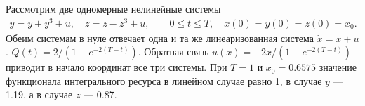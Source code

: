 \documentclass[../main.tex]{subfiles}
\begin{document}
	\begin{pr}
	 Рассмотрим две одномерные нелинейные системы
	 \begin{gather*}
		\dot{y} = y + y^3 + u, \quad 
		\dot{z} = z - z^3 + u, \qquad
		0 \leqslant t \leqslant T, \quad
		x(0) = y(0) = z(0) = x_0. 
	\end{gather*}
	Обеим системам в нуле отвечает одна и та же линеаризованная система $ \dot{x} = x + u$. $ Q(t) = 2/(1 - e^{-2(T-t)})$. Обратная связь $ u(x) = -2x/(1 - e^{-2(T-t)})$ приводит в начало координат все три системы. При $T = 1$ и $x_0 = 0.6575$ значение функционала интегрального ресурса в линейном случае равно 1, в случае $y$ --- 1.19, а в случае $z$ --- 0.87. 
	\end{pr}
\end{document}
